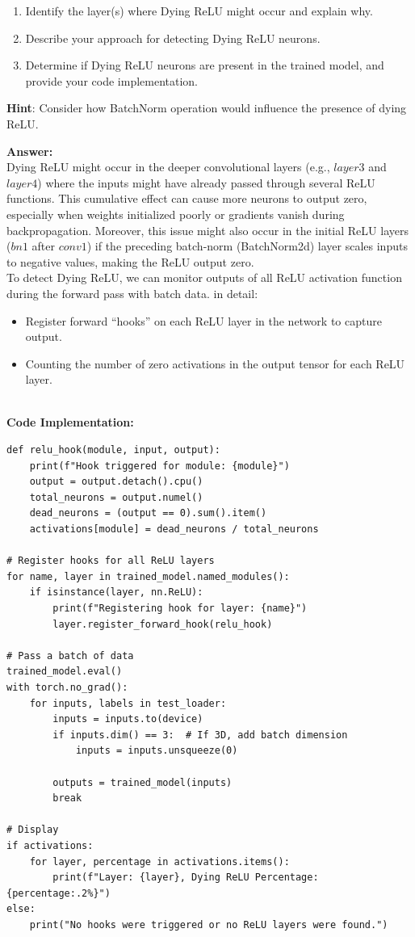 \documentclass[11pt, oneside]{article}   	%
\begin{document}
\begin{enumerate}
    \item Identify the layer(s) where Dying ReLU might occur and explain why.
    \item Describe your approach for detecting Dying ReLU neurons. 
    \item Determine if Dying ReLU neurons are present in the trained model, and provide your code implementation.
\end{enumerate}
\textbf{Hint}:
Consider how BatchNorm operation would influence the presence of dying ReLU.

\textbf{Answer:} \\
Dying ReLU might occur in the deeper convolutional layers (e.g., $layer3$ and $layer4$) where the inputs might have already passed through several ReLU functions. This cumulative effect can cause more neurons to output zero, especially when weights initialized poorly or gradients vanish during backpropagation. Moreover, this issue might also occur in the initial ReLU layers ($bn1$ after $conv1$) if the preceding batch-norm (BatchNorm2d) layer scales inputs to negative values, making the ReLU output zero.
\\
To detect Dying ReLU, we can monitor outputs of all ReLU activation function during the forward pass with batch data. in detail:
\begin{itemize}
    \item Register forward ``hooks'' on each ReLU layer in the network to capture output.
    \item Counting the number of zero activations in the output tensor for each ReLU layer.
\end{itemize}
\\
\textbf{Code Implementation: }
\begin{verbatim}
def relu_hook(module, input, output):
    print(f"Hook triggered for module: {module}")
    output = output.detach().cpu()
    total_neurons = output.numel()
    dead_neurons = (output == 0).sum().item()
    activations[module] = dead_neurons / total_neurons

# Register hooks for all ReLU layers
for name, layer in trained_model.named_modules():
    if isinstance(layer, nn.ReLU):
        print(f"Registering hook for layer: {name}")
        layer.register_forward_hook(relu_hook)

# Pass a batch of data
trained_model.eval()
with torch.no_grad():
    for inputs, labels in test_loader:
        inputs = inputs.to(device)
        if inputs.dim() == 3:  # If 3D, add batch dimension
            inputs = inputs.unsqueeze(0)

        outputs = trained_model(inputs)
        break

# Display
if activations:
    for layer, percentage in activations.items():
        print(f"Layer: {layer}, Dying ReLU Percentage: {percentage:.2%}")
else:
    print("No hooks were triggered or no ReLU layers were found.")
\end{verbatim}
\end{document}
